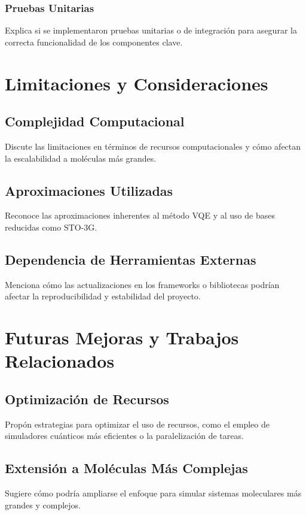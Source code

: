 \subsubsection{Pruebas Unitarias}
Explica si se implementaron pruebas unitarias o de integración para asegurar la correcta funcionalidad de los componentes clave.

\section{Limitaciones y Consideraciones}

\subsection{Complejidad Computacional}
Discute las limitaciones en términos de recursos computacionales y cómo afectan la escalabilidad a moléculas más grandes.

\subsection{Aproximaciones Utilizadas}
Reconoce las aproximaciones inherentes al método VQE y al uso de bases reducidas como STO-3G.

\subsection{Dependencia de Herramientas Externas}
Menciona cómo las actualizaciones en los frameworks o bibliotecas podrían afectar la reproducibilidad y estabilidad del proyecto.

\section{Futuras Mejoras y Trabajos Relacionados}

\subsection{Optimización de Recursos}
Propón estrategias para optimizar el uso de recursos, como el empleo de simuladores cuánticos más eficientes o la paralelización de tareas.

\subsection{Extensión a Moléculas Más Complejas}
Sugiere cómo podría ampliarse el enfoque para simular sistemas moleculares más grandes y complejos.

